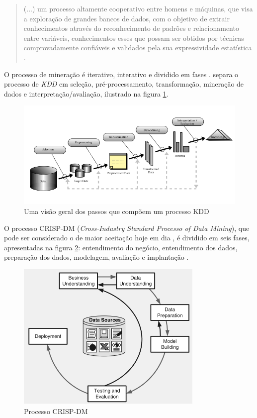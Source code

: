 \begin{quote}
    (...) um processo altamente cooperativo entre homens e máquinas, que visa a exploração de grandes bancos de dados, com o objetivo de extrair conhecimentos através do reconhecimento de padrões e relacionamento entre variáveis, conhecimentos esses que possam ser obtidos por técnicas comprovadamente confiáveis e validados pela sua expressividade estatística \cite[p.~1-2]{cortes2002mineraccao}.
\end{quote}

O processo de mineração é iterativo, interativo e dividido em fases \cite{camilo2009mineraccao}.  separa o processo de \textit{KDD} em seleção, pré-processamento, transformação, mineração de dados e interpretação/avaliação, ilustrado na figura \ref{fig:kdd-geral}.

\begin{figure}[h!]
    \includegraphics[width=\textwidth]{img/kdd.png}
    \caption{Uma visão geral dos passos que compõem um processo KDD \cite{fayyad1996data}}
    \centering
    \label{fig:kdd-geral}
\end{figure}

O processo CRISP-DM (\textit{Cross-Industry Standard Processo of Data Mining}), que pode ser considerado o de maior aceitação hoje em dia \cite{camilo2009mineraccao}, é dividido em seis fases, apresentadas na figura \ref{fig:crisp}: entendimento do negócio, entendimento dos dados, preparação dos dados, modelagem, avaliação e implantação \cite{olson2008advanced}.

\begin{figure}[h]
\centering
\includegraphics[width=0.8\textwidth]{img/crisp.png}
\caption{Processo CRISP-DM \cite{olson2008advanced}}
\label{fig:crisp}
\end{figure}


